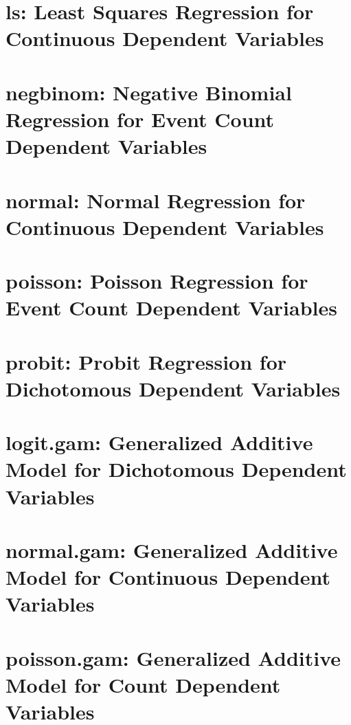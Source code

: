 \documentclass{book}
\begin{document}
\chapter[ls]{ls: Least Squares Regression for Continuous Dependent Variables}
\label{chapter:Ls}


\chapter[negbinom]{negbinom: Negative Binomial Regression for Event Count Dependent Variables}
\label{chapter:Negbinom}


\chapter[normal]{normal: Normal Regression for Continuous Dependent Variables}
\label{chapter:Normal}


\chapter[poisson]{poisson: Poisson Regression for Event Count Dependent Variables}
\label{chapter:Poisson}


\chapter[probit]{probit: Probit Regression for Dichotomous Dependent Variables}
\label{chapter:Probit}


\chapter[logit.gam]{logit.gam: Generalized Additive Model for Dichotomous Dependent Variables}
\label{chapter:logit.gam}


\chapter[normal.gam]{normal.gam: Generalized Additive Model for Continuous Dependent Variables}
\label{chapter:normal.gam}


\chapter[poisson.gam]{poisson.gam: Generalized Additive Model for Count Dependent Variables}
\label{chapter:poisson.gam}

\end{document}
